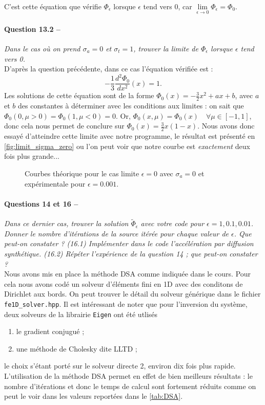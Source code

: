 \documentclass[11pt,a4paper]{article}
\newcommand{\question}[2]{\paragraph{Question #1 --}\hspace{-7pt}\textit{#2} \\}
\newcommand{\questions}[2]{\paragraph{Questions #1 --}\hspace{-7pt}\textit{#2} \\}
\newcommand{\Phit}{\widetilde{\Phi}}
\begin{document}
C'est cette équation que vérifie $\Phi_\epsilon$ lorsque $\epsilon$ tend vers 0, car $\lim\limits_{\epsilon \rightarrow 0} \Phi_\epsilon = \Phi_0$.

\question{13.2}{Dans le cas où on prend $\sigma_a = 0$ et $\sigma_t = 1$, trouver la limite de $\Phi_\epsilon$ lorsque $\epsilon$ tend vers 0.}

D'après la question précédente, dans ce cas l'équation vérifiée est :
\begin{equation}
- \frac{1}{3} \frac{d^2 \Phi_0}{d x^2}(x) = 1 .
\end{equation}
Les solutions de cette équation sont de la forme $\Phi_0(x) = -\frac{3}{2}x^2 + a x +b$, avec $a$ et $b$ des constantes à déterminer avec les conditions aux limites : on sait que $\Phi_0(0,\mu >0) = \Phi_0(1,\mu <0) = 0$.
Or, $\Phi_0(x,\mu) = \Phi_0(x) \quad \forall \mu \in [-1,1]$, donc cela nous permet de conclure sur $\Phi_0(x) = \frac{3}{2}x(1-x)$. Nous avons donc essayé d'atteindre cette limite avec notre programme, le résultat est présenté en \autoref{fig:limit_sigma_zero} ou l'on peut voir que notre courbe est \emph{exactement} deux fois plus grande...

\begin{figure}
  \centering
  
  \caption{Courbes théorique pour le cas limite $\epsilon=0$ avec $\sigma_a=0$ et expérimentale pour $\epsilon=0.001$.}
  \label{fig:limit_sigma_zero}
\end{figure}

\questions{14 et 16}{Dans ce dernier cas, trouver la solution $\Phit_\epsilon$ avec votre code pour $\epsilon = 1, 0.1, 0.01$. Donner le nombre d'itérations de la source itérée pour chaque valeur de $\epsilon$. Que peut-on constater ? (16.1) Implémenter dans le code l'accélération par diffusion synthétique. (16.2) Répéter l'expérience de la question 14 ; que peut-on constater ?}

Nous avons mis en place la méthode DSA comme indiquée dans le cours. Pour cela nous avons codé un solveur d'éléments fini en 1D avec des conditons de Dirichlet aux bords. On peut trouver le détail du solveur générique dans le fichier \texttt{fe1D\_solver.hpp}. Il est intéressant de noter que pour l'inversion du système, deux solveurs de la librairie \texttt{Eigen} ont été utlisés
\begin{enumerate}
\item le gradient conjugué ;
\item une méthode de Cholesky dite LLTD ;
\end{enumerate}
le choix s'étant porté sur le solveur directe 2, environ dix fois plus rapide. L'utilisation de la méthode DSA permet en effet de bien meilleurs résultats : le nombre d'itérations et donc le temps de calcul sont fortement réduits comme on peut le voir dans les valeurs reportées dans le \autoref{tab:DSA}. 
\end{document}
